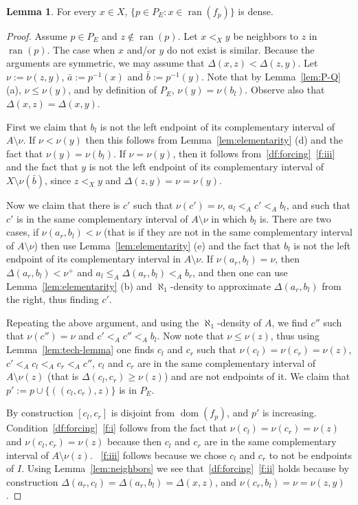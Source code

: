 \documentclass[10pt]{amsart}
\theoremstyle{definition}
\newtheorem{lemma}[theorem]{Lemma}
\theoremstyle{remark}
\newcommand{\setm}{\setminus}
\newcommand{\bb}{\bar{b}}
\newcommand{\1}{\mathbbm{1}}
\DeclareMathOperator{\dom}{dom}
\DeclareMathOperator{\ran}{ran}
\begin{document}
\begin{lemma}
   For every $x \in X$,
  $\{p \in P_{E} : x \in \ran(f_{p})\}$ is dense.
\end{lemma}
\begin{proof}
  Assume $p \in P_{E}$ and $z \notin \ran(p)$.
  Let $x <_{X} y$ be neighbors to $z$ in $\ran(p)$.
  The case when $x$ and/or $y$ do not exist is similar.
  Because the arguments are symmetric, we may assume
  that $\Delta(x,z) < \Delta(z,y)$. Let $\nu := \nu(z,y)$,
   $\bar{a} := p^{-1}(x)$ and $\bar{b} := p^{-1}(y)$.
  Note that by Lemma~\ref{lem:P-Q} (a), $\nu \le \nu(y)$,
  and by definition of $P_{E}$,
  $\nu(y) = \nu(b_{l})$. Observe also that
  $\Delta(x,z) = \Delta(x,y)$.

  First we claim that $b_{l}$ is not the left endpoint of its complementary interval
  of $A \setm \nu$. If $\nu < \nu(y)$ then this follows from Lemma~\ref{lem:elementarity} (d)
  and the fact that $\nu(y) = \nu(b_{l})$.
  If $\nu = \nu(y)$, then it follows
  from~\ref{df:forcing}~\ref{f:iii} and
  the fact that $y$ is not the left endpoint of its complementary interval
  of $X \setm \nu(\bb)$, since $z <_{X} y$ and $\Delta(z,y) = \nu = \nu(y)$.

  Now we claim that there is $c'$ such that $\nu(c') = \nu$, $a_{l} <_{A} c' <_{A} b_{l}$,
  and such that $c'$ is in the same complementary interval of $A \setm \nu$ in
  which $b_{l}$ is. There are two cases, if $\nu(a_{r},b_{l}) < \nu$ (that is if they are
  not in the same complementary interval of $A \setm \nu$)
  then use Lemma~\ref{lem:elementarity} (e) and the fact that $b_{l}$ is not the
  left endpoint of its complementary interval in $A \setm \nu$. If
  $\nu(a_{r},b_{l}) = \nu$, then $\Delta(a_{r},b_{l}) < \nu^{+}$
  and $a_{l} \le_{A} \Delta(a_{r},b_{l}) <_{A} b_{r}$, and then one can
  use Lemma~\ref{lem:elementarity} (b) and $\aleph_{1}$-density to
  approximate $\Delta(a_{r},b_{l})$ from the right, thus finding $c'$.

  Repeating the above argument, and using the $\aleph_{1}$-density  of $A$,
  we find $c''$ such that $\nu(c'') = \nu$ and
  $c' <_{A} c'' <_{A} b_{l}$. Now note that $\nu \le \nu(z)$,
  thus using Lemma~\ref{lem:tech-lemma} one finds $c_{l}$ and $c_{r}$ such that
  $\nu(c_{l}) = \nu(c_{r}) = \nu(z)$, $c' <_{A} c_{l} <_{A} c_{r} <_{A} c''$,
  $c_{l}$ and $c_{r}$ are in the same complementary interval of $A \setm \nu(z)$
  (that is $\Delta(c_{l},c_{r}) \ge \nu(z)$) and are not endpoints of it.
  We claim that $p' := p \cup \{((c_{l},c_{r}),z)\}$ is in $P_{E}$.

  By construction $[c_{l},c_{r}]$ is disjoint from $\dom(f_{p})$,
  and $p'$ is increasing. Condition~\ref{df:forcing}~\ref{f:i}
  follows from the
  fact that $\nu(c_{l})= \nu(c_{r}) = \nu(z)$ and
  $\nu(c_{l},c_{r}) = \nu(z)$
  because then $c_{l}$ and $c_{r}$ are in the same complementary
  interval of $A \setm \nu(z)$. ~\ref{f:iii}
  follows because we chose
  $c_{l}$ and $c_{r}$ to not be endpoints of $I$. Using Lemma~\ref{lem:neighbors}
  we see that~\ref{df:forcing}~\ref{f:ii} holds because by construction
  $\Delta(a_{r},c_{l}) = \Delta(a_{r},b_{l}) = \Delta(x,z)$,
  and $\nu(c_{r},b_{l}) = \nu = \nu(z,y)$.
\end{proof}
\end{document}
